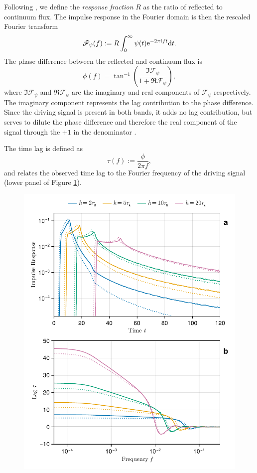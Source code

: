 \documentclass[fleqn,usenatbib]{mnras}
\begin{document}
Following \cite{cackett_modelling_2014}, we define the \textit{response fraction} $R$ as the ratio of reflected to continuum flux. The impulse response in the Fourier domain is then the rescaled Fourier transform
\begin{equation}
	\mathscr{F}_\psi(f) := R \int_{0}^\infty \psi(t) \text{e}^{-2\pi i f t} \text{d} t.
\end{equation}
The phase difference between the reflected and continuum flux is 
\begin{equation}
	\phi(f) = \tan^{-1} \left( 
		\frac{\Im{\mathscr{F}_\psi}}{1 + \Re{\mathscr{F}_\psi}} 
	\right),
\end{equation}
where $\Im{\mathscr{F}_\psi}$ and $\Re{\mathscr{F}_\psi}$ are the imaginary and real components of $\mathscr{F}_\psi$ respectively. The imaginary component represents the lag contribution to the phase difference. Since the driving signal is present in both bands, it adds no lag contribution, but serves to dilute the phase difference and therefore the real component of the signal through the $+1$ in the denominator \citep{cackett_modelling_2014}. 

The time lag is defined as 
\begin{equation}
	\tau(f) := \frac{\phi}{2 \pi f},
\end{equation}
and relates the observed time lag to the Fourier frequency of the driving signal (lower panel of Figure \ref{fig:reverberation-thin}).

\begin{figure}
	\centering
	\includegraphics[width=0.98\linewidth]{figures/reverberation.thin-disc.pdf}
	\caption{}
	\label{fig:reverberation-thin}
\end{figure}
\end{document}
